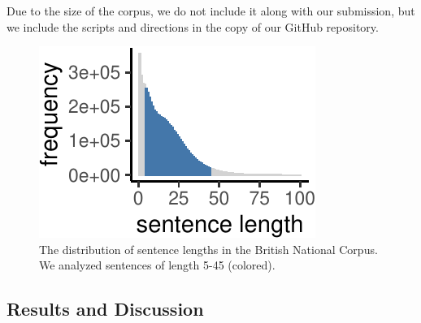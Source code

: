 \documentclass[
  english,
  man,floatsintext]{apa6}
\begin{document}
Due to the size of the corpus, we do not include it along with our submission, but we include the scripts and directions in the copy of our GitHub repository.

\begin{figure}[tb]

{\centering \includegraphics{figs/bnc-lengths-1} 

}

\caption{The distribution of sentence lengths in the British National Corpus. We analyzed sentences of length 5-45 (colored).}\label{fig:bnc-lengths}
\end{figure}

\hypertarget{results-and-discussion}{%
\subsection{Results and Discussion}\label{results-and-discussion}}
\end{document}
